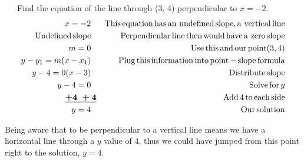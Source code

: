 \begin{example}\label{Lin73}~~~Find the equation of the line through (3, 4) perpendicular to $x = - 2$.
  \begin{eqnarray*}
    x = - 2~~ &  & \operatorname{This} \operatorname{equation} \operatorname{has} \operatorname{an~undefined}
    \operatorname{slope}, \operatorname{a~vertical} \operatorname{line}\\
    \operatorname{Undefined} \operatorname{slope}~~ &  & \operatorname{Perpendicular} \operatorname{line} \operatorname{then}
    \operatorname{would} \operatorname{have} \operatorname{a~zero} \operatorname{slope}\\
    m = 0~~ &  & \operatorname{Use} \operatorname{this} \operatorname{and} \operatorname{our} \operatorname{point} (3,
    4)\\
    y - y_1 = m (x - x_1)~~ &  & \operatorname{Plug} \operatorname{this} \operatorname{information}
    \operatorname{into} \operatorname{point} - \operatorname{slope} \operatorname{formula}\\
    y - 4 = 0 (x - 3)~~ &  & \operatorname{Distribute} \operatorname{slope}\\
    y - 4 = 0~~ &  & \operatorname{Solve} \operatorname{for} y\\
    \boldsymbol{\underline{+ 4 ~+ 4}} &  & \operatorname{Add} 4 \operatorname{to} \operatorname{each} \operatorname{side}\\
    y = 4~~ &  & \operatorname{Our} \operatorname{solution}
  \end{eqnarray*}
\end{example}

 Being aware that to be perpendicular to a vertical line means we have a
horizontal line through a $y$ value of 4, thus we could have jumped from this
point right to the solution, $y = 4$.
